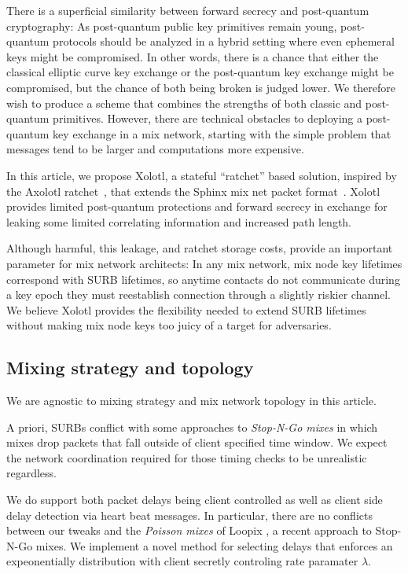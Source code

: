 There is a superficial similarity between forward secrecy and
post-quantum cryptography: As post-quantum public key primitives
remain young, post-quantum protocols should be analyzed in a hybrid
setting where even ephemeral keys might be compromised.  In other
words, there is a chance that either the classical elliptic curve key
exchange or the post-quantum key exchange might be compromised, but
the chance of both being broken is judged lower.  We therefore wish
to produce a scheme that combines the strengths of both classic and
post-quantum primitives.  However, there are technical obstacles to
deploying a post-quantum key exchange in a mix network, starting with
the simple problem that messages tend to be larger
and computations more expensive.

In this article, we propose Xolotl, a stateful ``ratchet'' based
solution, inspired by the Axolotl ratchet~\cite{TextSecure}, that
extends the Sphinx mix net packet format~\cite{Sphinx}.  
Xolotl provides limited post-quantum protections and forward secrecy
in exchange for leaking some limited correlating information and
increased path length.  

Although harmful, this leakage, and ratchet storage costs, provide an
important parameter for mix network architects:  In any mix network,
mix node key lifetimes correspond with SURB lifetimes, so anytime
contacts do not communicate during a key epoch they must reestablish
connection through a slightly riskier channel.  We believe Xolotl
provides the flexibility needed to extend SURB lifetimes without
making mix node keys too juicy of a target for adversaries.

\subsection{Mixing strategy and topology}

We are agnostic to mixing strategy and mix network topology in this
article. 

A priori, SURBs conflict with some approaches to {\em Stop-N-Go mixes}
\cite{StopNGo} in which mixes drop packets that fall outside of client
specified time window.  We expect the network coordination required
for those timing checks to be unrealistic regardless. 

We do support both packet delays being client controlled as well as
client side delay detection via heart beat messages.  In particular,
there are no conflicts between our tweaks and the {\em Poisson mixes}
of Loopix \cite{Loopix}, a recent approach to Stop-N-Go mixes.
We implement a novel method for selecting delays that enforces an
expeonentially distribution with client secretly controling rate
paramater $\lambda$.  

